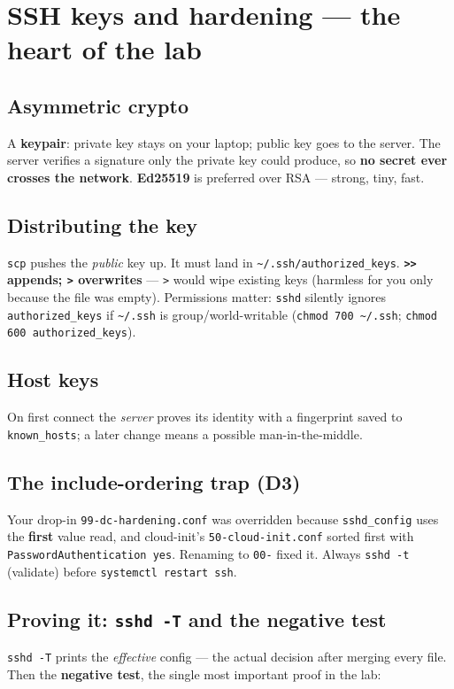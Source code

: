 \documentclass[11pt,a4paper]{article}
\begin{document}
\section{SSH keys and hardening — the heart of the lab}
\subsection{Asymmetric crypto}
A \textbf{keypair}: private key stays on your laptop; public key goes to the
server. The server verifies a signature only the private key could produce, so
\textbf{no secret ever crosses the network}. \textbf{Ed25519} is preferred over
RSA — strong, tiny, fast.
\subsection{Distributing the key}
\texttt{scp} pushes the \emph{public} key up. It must land in
\texttt{\~{}/.ssh/authorized\_keys}. \textbf{\texttt{>>} appends;
\texttt{>} overwrites} — \texttt{>} would wipe existing keys (harmless for you
only because the file was empty). Permissions matter: \texttt{sshd} silently
ignores \texttt{authorized\_keys} if \texttt{\~{}/.ssh} is group/world-writable
(\texttt{chmod 700 \~{}/.ssh}; \texttt{chmod 600 authorized\_keys}).
\subsection{Host keys}
On first connect the \emph{server} proves its identity with a fingerprint saved
to \texttt{known\_hosts}; a later change means a possible man-in-the-middle.
\subsection{The include-ordering trap (D3)}
Your drop-in \texttt{99-dc-hardening.conf} was overridden because
\texttt{sshd\_config} uses the \textbf{first} value read, and cloud-init's
\texttt{50-cloud-init.conf} sorted first with \texttt{PasswordAuthentication
yes}. Renaming to \texttt{00-} fixed it. Always \texttt{sshd -t} (validate)
before \texttt{systemctl restart ssh}.
\subsection{Proving it: \texttt{sshd -T} and the negative test}
\texttt{sshd -T} prints the \emph{effective} config — the actual decision after
merging every file. Then the \textbf{negative test}, the single most important
proof in the lab:
\end{document}
